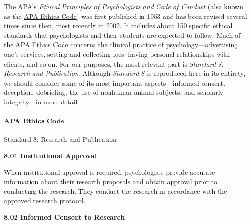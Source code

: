 \documentclass[
]{krantz}
\begin{document}
The APA's \emph{Ethical Principles of Psychologists and Code of Conduct} (also known as the \protect\hyperlink{apa-ethics-code-2}{APA Ethics Code}) was first published in 1953 and has been revised several times since then, most recently in 2002. It includes about 150 specific ethical standards that psychologists and their students are expected to follow. Much of the APA Ethics Code concerns the clinical practice of psychology---advertising one's services, setting and collecting fees, having personal relationships with clients, and so on. For our purposes, the most relevant part is \emph{Standard 8: Research and Publication}. Although \emph{Standard 8} is reproduced here in its entirety, we should consider some of its most important aspects---informed consent, deception, debriefing, the use of nonhuman animal subjects, and scholarly integrity---in more detail.

\hypertarget{apa-ethics-code-1}{%
\paragraph*{APA Ethics Code}\label{apa-ethics-code-1}}

Standard 8: Research and Publication

\textbf{8.01 Institutional Approval}

When institutional approval is required, psychologists provide accurate information about their research proposals and obtain approval prior to conducting the research. They conduct the research in accordance with the approved research protocol.

\textbf{8.02 Informed Consent to Research}
\end{document}
